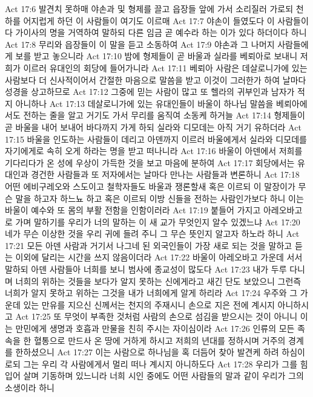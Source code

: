 Act 17:6  발견치 못하매 야손과 및 형제를 끌고 읍장들 앞에 가서 소리질러 가로되 천하를 어지럽게 하던 이 사람들이 여기도 이르매
Act 17:7  야손이 들였도다 이 사람들이 다 가이사의 명을 거역하여 말하되 다른 임금 곧 예수라 하는 이가 있다 하더이다 하니
Act 17:8  무리와 읍장들이 이 말을 듣고 소동하여
Act 17:9  야손과 그 나머지 사람들에게 보를 받고 놓으니라
Act 17:10  밤에 형제들이 곧 바울과 실라를 베뢰아로 보내니 저희가 이르러 유대인의 회당에 들어가니라
Act 17:11  베뢰아 사람은 데살로니가에 있는 사람보다 더 신사적이어서 간절한 마음으로 말씀을 받고 이것이 그러한가 하여 날마다 성경을 상고하므로
Act 17:12  그중에 믿는 사람이 많고 또 헬라의 귀부인과 남자가 적지 아니하나
Act 17:13  데살로니가에 있는 유대인들이 바울이 하나님 말씀을 베뢰아에서도 전하는 줄을 알고 거기도 가서 무리를 움직여 소동케 하거늘
Act 17:14  형제들이 곧 바울을 내어 보내어 바다까지 가게 하되 실라와 디모데는 아직 거기 유하더라
Act 17:15  바울을 인도하는 사람들이 데리고 아덴까지 이르러 바울에게서 실라와 디모데를 자기에게로 속히 오게 하라는 명을 받고 떠나니라
Act 17:16  바울이 아덴에서 저희를 기다리다가 온 성에 우상이 가득한 것을 보고 마음에 분하여
Act 17:17  회당에서는 유대인과 경건한 사람들과 또 저자에서는 날마다 만나는 사람들과 변론하니
Act 17:18  어떤 에비구레오와 스도이고 철학자들도 바울과 쟁론할새 혹은 이르되 이 말장이가 무슨 말을 하고자 하느뇨 하고 혹은 이르되 이방 신들을 전하는 사람인가보다 하니 이는 바울이 예수와 또 몸의 부활 전함을 인함이러라
Act 17:19  붙들어 가지고 아레오바고로 가며 말하기를 우리가 너의 말하는 이 새 교가 무엇인지 알수 있겠느냐
Act 17:20  네가 무슨 이상한 것을 우리 귀에 들려 주니 그 무슨 뜻인지 알고자 하노라 하니
Act 17:21  모든 아덴 사람과 거기서 나그네 된 외국인들이 가장 새로 되는 것을 말하고 듣는 이외에 달리는 시간을 쓰지 않음이더라
Act 17:22  바울이 아레오바고 가운데 서서 말하되 아덴 사람들아 너희를 보니 범사에 종교성이 많도다
Act 17:23  내가 두루 다니며 너희의 위하는 것들을 보다가 알지 못하는 신에게라고 새긴 단도 보았으니 그런즉 너희가 알지 못하고 위하는 그것을 내가 너희에게 알게 하리라
Act 17:24  우주와 그 가운데 있는 만유를 지으신 신께서는 천지의 주재시니 손으로 지은 전에 계시지 아니하시고
Act 17:25  또 무엇이 부족한 것처럼 사람의 손으로 섬김을 받으시는 것이 아니니 이는 만민에게 생명과 호흡과 만물을 친히 주시는 자이심이라
Act 17:26  인류의 모든 족속을 한 혈통으로 만드사 온 땅에 거하게 하시고 저희의 년대를 정하시며 거주의 경계를 한하셨으니
Act 17:27  이는 사람으로 하나님을 혹 더듬어 찾아 발견케 하려 하심이로되 그는 우리 각 사람에게서 멀리 떠나 계시지 아니하도다
Act 17:28  우리가 그를 힘입어 살며 기동하며 있느니라 너희 시인 중에도 어떤 사람들의 말과 같이 우리가 그의 소생이라 하니
